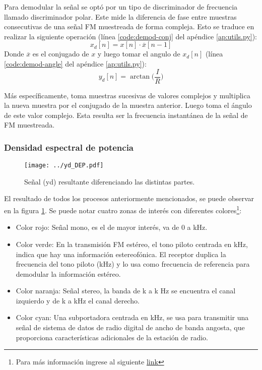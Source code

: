 Para demodular la señal se optó por un tipo de discriminador de frecuencia llamado discriminador polar.
Este mide la diferencia de fase entre muestras consecutivas de una señal FM muestreada de forma compleja. Esto se traduce en realizar la siguiente operación (línea \ref{code:demod-conj} del apéndice \ref{ap:utils.py}):
$$
	x_d[n] = x[n] \cdot \overline{x}[n-1]
$$
Donde $\overline{x}$ es el conjugado de $x$ y luego tomar el angulo de $x_d[n]$ (línea \ref{code:demod-angle} del apéndice \ref{ap:utils.py}):
$$
	y_d[n] = \arctan\Big( \frac{I}{R} \Big)
$$

Más específicamente, toma muestras sucesivas de valores complejos y multiplica la nueva muestra por el conjugado de la muestra anterior. Luego toma el ángulo de este valor complejo. Esta resulta ser la frecuencia instantánea de la señal de FM muestreada.

\subsubsection{Densidad espectral de potencia}

\begin{figure}[ht!]
	\centering
	\texttt{[image: ../yd\_DEP.pdf]}
	\caption{Señal (yd) resultante diferenciando las distintas partes.}
	\label{fig:yd-DEP}
\end{figure}

El resultado de todos los procesos anteriormente mencionados, se puede observar en la figura \ref{fig:yd-DEP}.
Se puede notar cuatro zonas de interés con diferentes colores\footnote{Para más información ingrese al siguiente \href{https://en.wikipedia.org/wiki/FM\_broadcasting\#Other\_subcarrier\_services}{link}}:

\begin{itemize}
	\item Color rojo: Señal mono, es el de mayor interés, va de 0 a \limitMono kHz.
	\item Color verde: En la transmisión FM estéreo, el tono piloto centrada en \pilotTone kHz, indica que hay una información estereofónica. El receptor duplica la frecuencia del tono piloto (\centeredStereo kHz) y lo usa como frecuencia de referencia para demodular la información estéreo.
	\item Color naranja: Señal stereo, la banda de \leftLimitStereo k a \centeredStereo k Hz se encuentra el canal izquierdo y de \centeredStereo k a \rightLimitStereo kHz el canal derecho.
	\item Color cyan: Una subportadora centrada en \digitalCarrier kHz, se usa para transmitir una señal de sistema de datos de radio digital de ancho de banda angosta, que proporciona características adicionales de la estación de radio.
\end{itemize}

